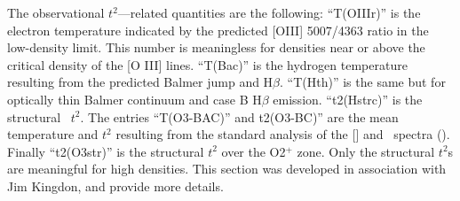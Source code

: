 The observational $t^2$---related quantities are the following:  ``T(OIIIr)''
is the electron temperature indicated by the predicted [OIII] 5007/4363
ratio in the low-density limit.
This number is meaningless for densities
near or above the critical density of the [O III] lines.
``T(Bac)'' is
the hydrogen temperature resulting from the predicted Balmer jump and
H$\beta$.
``T(Hth)'' is the same but for optically thin Balmer continuum and case
B H$\beta$ emission.
``t2(Hstrc)'' is the structural \hii\ $t^2$.
The entries
``T(O3-BAC)'' and t2(O3-BC)'' are the mean temperature and $t^2$ resulting
from the standard analysis of the [\oiii] and \hi\ spectra (\citealp{Peimbert1967}).
Finally ``t2(O3str)'' is the structural $t^2$ over the O2$^+$ zone.
Only the
structural $t^2$s are meaningful for high densities.
This section was developed
in association with Jim Kingdon, and
\citet{KingdonFerland1995} provide
more details.
